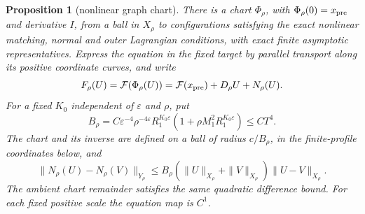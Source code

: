 \documentclass[11pt]{amsart}
\newtheorem{proposition}[theorem]{Proposition}
\theoremstyle{definition}
\theoremstyle{remark}
\theoremstyle{plain}
\begin{document}
\begin{proposition}[nonlinear graph chart]\label{prop:gluing-nonlinear-chart}
There is a chart $\Phi_\rho$, with $\Phi_\rho(0)=x_{\rm pre}$
and derivative $I$, from a ball in $X_\rho$ to configurations
satisfying the exact nonlinear matching, normal and outer Lagrangian
conditions, with exact finite asymptotic representatives. Express the
equation in the fixed target by parallel transport along its positive
coordinate curves, and write
\[
 F_\rho(U)=\mathcal F(\Phi_\rho(U))
              =\mathcal F(x_{\rm pre})+D_\rho U+N_\rho(U).
\]
For a fixed $K_0$ independent of $\varepsilon$ and $\rho$, put
\begin{equation}\label{eq:gluing-nonlinear-constant}
 B_\rho=C\varepsilon^{-4}\rho^{-4\varepsilon}R_1^{K_0\varepsilon}
                         (1+\rho M_1^2R_1^{K_0\varepsilon})\leq CT^4.
\end{equation}
The chart and its inverse are defined on a ball of radius $c/B_\rho$,
in the finite-profile coordinates below, and
\begin{equation}\label{eq:gluing-nonlinear-difference}
 \|N_\rho(U)-N_\rho(V)\|_{Y_\rho}
  \leq B_\rho(\|U\|_{X_\rho}+\|V\|_{X_\rho})\|U-V\|_{X_\rho}.
\end{equation}
The ambient chart remainder satisfies the same quadratic difference
bound. For each fixed positive scale the equation map is $C^1$.
\end{proposition}
\end{document}
